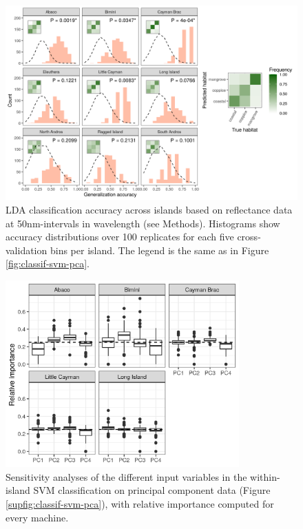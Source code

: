 \begin{figure}[H]
	\centering
	\includegraphics[width=\textwidth]{"../analyses/04-machine learning/plots/classif_lda_refl"}
	\caption{LDA classification accuracy across islands based on reflectance data at 50nm-intervals in wavelength (see Methods). Histograms show accuracy distributions over 100 replicates for each five cross-validation bins per island. The legend is the same as in Figure \ref{fig:classif-svm-pca}.}
	\label{supfig:classif-lda-refl}
\end{figure}

\begin{figure}[H]
	\centering
	\includegraphics[width=0.8\textwidth]{"../analyses/04-machine learning/plots/importance_svm_pca"}
	\caption{Sensitivity analyses of the different input variables in the within-island SVM classification on principal component data (Figure \ref{supfig:classif-svm-pca}), with relative importance computed for every machine.}
	\label{supfig:importance-svm-pca}
\end{figure}

